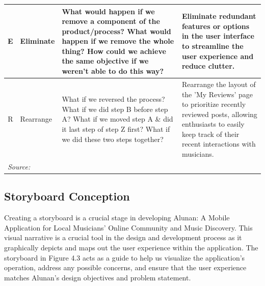 \begin{longtable}{|c|p{3cm}|p{4.5cm}|p{4.5cm}|}
\hline
E & Eliminate & What would happen if we remove a component of the product/process? What would happen if we remove the whole thing? How could we achieve the same objective if we weren't able to do this way? & Eliminate redundant features or options in the user interface to streamline the user experience and reduce clutter. \\
\hline
R & Rearrange & What if we reversed the process? What if we did step B before step A? What if we moved step A \& did it last step of step Z first? What if we did these two steps together? & Rearrange the layout of the 'My Reviews' page to prioritize recently reviewed posts, allowing enthusiasts to easily keep track of their recent interactions with musicians. \\
\hline
\multicolumn{4}{l}{\textit{Source: \textcite{santos15}}} \\
\end{longtable}
\pagebreak

\subsection{Storyboard Conception}
Creating a storyboard is a crucial stage in developing Alunan: A Mobile Application for Local Musicians’ Online Community and Music Discovery. This visual narrative is a crucial tool in the design and development process as it graphically depicts and maps out the user experience within the application. The storyboard in Figure 4.3 acts as a guide to help us visualize the application's operation, address any possible concerns, and ensure that the user experience matches Alunan's design objectives and problem statement.

